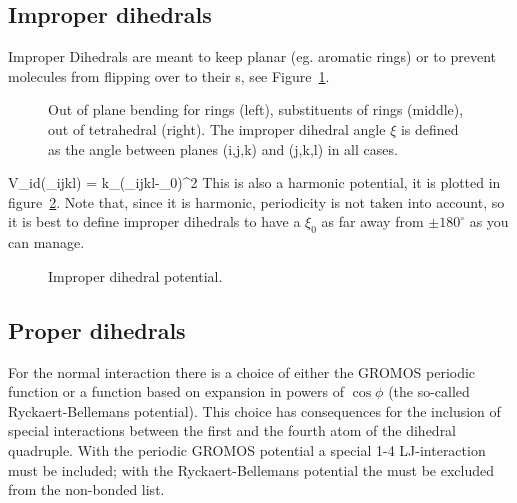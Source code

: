 \newcommand{\rvkj}{{\bf r}_{kj}}
\newcommand{\rkj}{r_{kj}}

\subsection{Improper dihedrals}
Improper Dihedrals are meant to keep  planar (eg. 
aromatic rings) or to prevent molecules from flipping over to their
s, see Figure~\ref{Fig:imp}.

\begin {figure}
\centerline{\hspace{1cm}
\hspace{1cm}}
\caption[Improper dihedral types.]{Out of plane bending for rings (left), substituents of rings (middle), out of tetrahedral (right). The improper dihedral angle $\xi$ is defined as the angle between planes (i,j,k) and (j,k,l) in all cases.}
\label{Fig:imp}
\end {figure}

\beq
V_{id}(\xi_{ijkl}) = k_{\xi}(\xi_{ijkl}-\xi_0)^2
\eeq
This is also a harmonic potential, it is plotted in
figure~\ref{fig:imps}. Note that, since it is harmonic, periodicity is
not taken into account, so it is best to define improper dihedrals
to have a $\xi_0$ as far away from $\pm 180^\circ$ as you can manage.

\begin{figure}
\centerline{}
\caption {Improper dihedral potential.}
\label{fig:imps}
\end{figure}

\subsection{Proper dihedrals}
For the normal  interaction there is a choice of either the
GROMOS periodic function or a function based on expansion in powers of
$\cos \phi$ (the so-called Ryckaert-Bellemans potential). This choice
has consequences for the inclusion of special interactions between the
first and the fourth atom of the dihedral quadruple. With the periodic
GROMOS potential a special 1-4 LJ-interaction must be included; with
the Ryckaert-Bellemans potential the  
must be excluded from the non-bonded list.  

